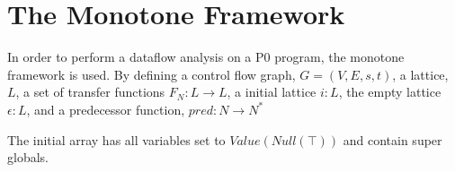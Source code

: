 \section{The Monotone Framework}
In order to perform a dataflow analysis on a P0 program, the monotone framework is used. By defining a control flow graph, $G = (V, E, s,t)$, a lattice, $L$, a set of transfer functions $F_N : L \rightarrow L$, a initial lattice $i : L$, the empty lattice $\epsilon : L$, and a predecessor function, $pred : N \rightarrow N^*$

The initial array has all variables set to $Value(Null(\top))$ and contain super globals.

